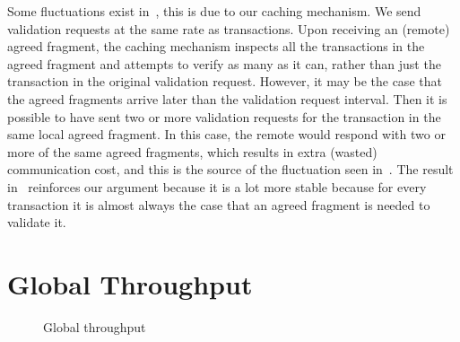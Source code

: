 Some fluctuations exist in~, this is due to our caching mechanism.
We send validation requests at the same rate as transactions.
Upon receiving an (remote) agreed fragment, the caching mechanism inspects all the transactions in the agreed fragment and attempts to verify as many as it can,
rather than just the transaction in the original validation request.
However, it may be the case that the agreed fragments arrive later than the validation request interval.
Then it is possible to have sent two or more validation requests for the transaction in the same local agreed fragment.
In this case, the remote would respond with two or more of the same agreed fragments,
which results in extra (wasted) communication cost, and this is the source of the fluctuation seen in~.
The result in~ reinforces our argument because it is a lot more stable because for every transaction it is almost always the case that an agreed fragment is needed to validate it.

\section{Global Throughput}
\begin{figure}[h]
  \centering
  \caption{Global throughput}
  \label{fig:global-throughput}
\end{figure}


